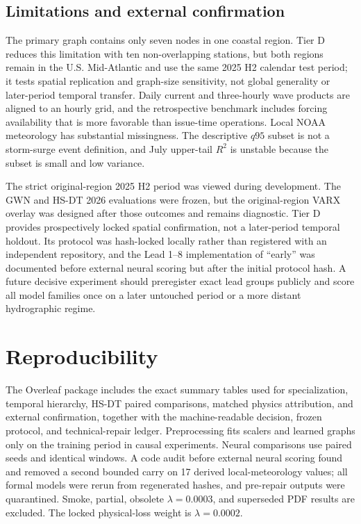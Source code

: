 \documentclass[final,5p,times,twocolumn]{elsarticle}
\begin{document}
\subsection{Limitations and external confirmation}
The primary graph contains only seven nodes in one coastal region. Tier D reduces this limitation with ten non-overlapping stations, but both regions remain in the U.S. Mid-Atlantic and use the same 2025 H2 calendar test period; it tests spatial replication and graph-size sensitivity, not global generality or later-period temporal transfer. Daily current and three-hourly wave products are aligned to an hourly grid, and the retrospective benchmark includes forcing availability that is more favorable than issue-time operations. Local NOAA meteorology has substantial missingness. The descriptive $q95$ subset is not a storm-surge event definition, and July upper-tail $R^2$ is unstable because the subset is small and low variance.

The strict original-region 2025 H2 period was viewed during development. The GWN and HS-DT 2026 evaluations were frozen, but the original-region VARX overlay was designed after those outcomes and remains diagnostic. Tier D provides prospectively locked spatial confirmation, not a later-period temporal holdout. Its protocol was hash-locked locally rather than registered with an independent repository, and the Lead 1--8 implementation of ``early'' was documented before external neural scoring but after the initial protocol hash. A future decisive experiment should preregister exact lead groups publicly and score all model families once on a later untouched period or a more distant hydrographic regime.

\section{Reproducibility}
The Overleaf package includes the exact summary tables used for specialization, temporal hierarchy, HS-DT paired comparisons, matched physics attribution, and external confirmation, together with the machine-readable decision, frozen protocol, and technical-repair ledger. Preprocessing fits scalers and learned graphs only on the training period in causal experiments. Neural comparisons use paired seeds and identical windows. A code audit before external neural scoring found and removed a second bounded carry on 17 derived local-meteorology values; all formal models were rerun from regenerated hashes, and pre-repair outputs were quarantined. Smoke, partial, obsolete $\lambda=0.0003$, and superseded PDF results are excluded. The locked physical-loss weight is $\lambda=0.0002$.
\end{document}
